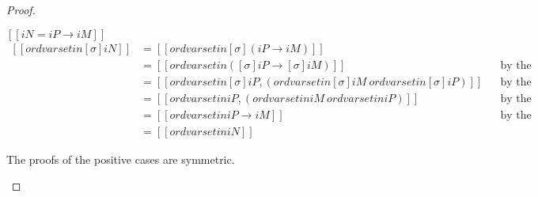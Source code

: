 \begin{proof}
\begin{caseof}
    \item $[[iN = iP → iM]]$\\
       $ \begin{aligned}
        [[ ord varset in [σ]iN ]] &= [[ ord varset in [σ](iP → iM) ]] \\
                                   &= [[ ord varset in ([σ]iP → [σ]iM) ]]
                                   && \text{by the definition of substitution}\\
                                   &= [[ ord varset in [σ]iP, (ord varset in [σ]iM \ {ord varset in [σ]iP}) ]]
                                   && \text{by the definition of ordering}\\
                                   &= [[ ord varset in iP, (ord varset in iM \ {ord varset in iP}) ]]
                                   && \text{by the induction hypothesis}\\
                                   &= [[ ord varset in iP → iM ]]
                                   && \text{by the definition of ordering}\\
                                   &= [[ ord varset in iN ]]
       \end{aligned} $
    \item The proofs of the positive cases are symmetric.
  \end{caseof}
\end{proof}


